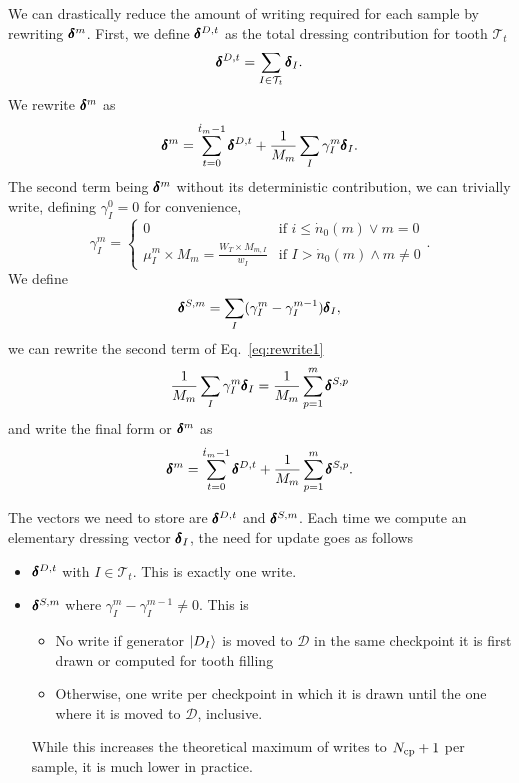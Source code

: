 \documentclass[./thesis.tex]{subfiles}
\begin{document}
We can drastically reduce the amount of writing required for each sample by rewriting $\pmb \delta^m$.
First, we define $\pmb \delta^{D,t}$ as the total dressing contribution for tooth $\mathcal{T}_t$
\begin{equation}
\pmb \delta^{D,t} = \sum_{I \in \mathcal{T}_t} \pmb \delta_I.
\end{equation}
We rewrite $\pmb \delta^m$ as
\begin{equation}
\label{eq:rewrite1}
\pmb \delta^{m} = \sum_{t=0}^{\dot t_m - 1} \pmb \delta^{D,t}+ \frac{1}{M_m} \sum_{I} \gamma^m_{I} \pmb \delta_I.
\end{equation}
The second term being $\pmb \delta^m$ without its deterministic contribution, we can trivially write, defining $\gamma^ 0_I=0$ for convenience,
\begin{equation}
\gamma^m_I = 
\begin{cases}
0 & \text{if } i \leq \dot n_0(m) \vee m=0 \\
\mu^m_I \times M_m = \frac{W_T \times M_{m,I}}{w_I} & \text{if } I > \dot n_0(m) \wedge m \neq 0
\end{cases}.
\end{equation}
We define
\begin{align}
\pmb \delta^{S,m} = \sum_I (\gamma^m_I - \gamma^{m-1}_I) \pmb \delta_I,
\end{align}
we can rewrite the second term of Eq.~\eqref{eq:rewrite1}
\begin{equation}
\frac{1}{M_m}\sum_{I} \gamma^m_{I} \pmb \delta_I = \frac{1}{M_m} \sum_{p=1}^m \pmb \delta^{S,p}
\end{equation}
and write the final form or $\pmb \delta^m$ as
\begin{equation}
\pmb \delta^m=\sum_{t=0}^{\dot t_{m}-1} \pmb \delta^{D,t} + \frac{1}{M_m} \sum_{p=1}^m \pmb \delta^{S,p}.
\end{equation}

The vectors we need to store are $\pmb \delta^{D,t}$ and $\pmb \delta^{S,m}$. Each time we compute an elementary dressing vector $\pmb \delta_I$, the need for update goes as follows
\begin{itemize}
\item
$\pmb \delta^{D,t}$ with $I \in \mathcal{T}_t$. This is exactly one write.
\item
$\pmb \delta^{S,m}$ where $\gamma^m_I - \gamma^{m-1}_I \neq 0$. This is
 \begin{itemize}
 \item No write if generator $\ket{D_I}$ is moved to $\mathcal{D}$ in the same checkpoint it is first drawn or computed for tooth filling
 \item Otherwise, one write per checkpoint in which it is drawn until the one where it is moved to $\mathcal{D}$, inclusive.
 \end{itemize}
 While this increases the theoretical maximum of writes to ${N_\text{cp}}+1$ per sample, it is much lower in practice.
\end{itemize}
\end{document}
